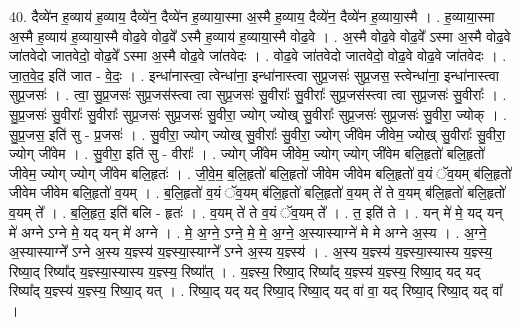 \documentclass[17pt]{extarticle}
\begin{document}
40. दैव्ये॑न ह॒व्याय॑ ह॒व्याय॒ दैव्ये॑न॒ दैव्ये॑न ह॒व्याया॒स्मा अ॒स्मै ह॒व्याय॒ दैव्ये॑न॒ दैव्ये॑न ह॒व्याया॒स्मै । . ह॒व्याया॒स्मा अ॒स्मै ह॒व्याय॑ ह॒व्याया॒स्मै वोढ॒वे वोढ॒वे᳚ ऽस्मै ह॒व्याय॑ ह॒व्याया॒स्मै वोढ॒वे । . अ॒स्मै वोढ॒वे वोढ॒वे᳚ ऽस्मा अ॒स्मै वोढ॒वे जा॑तवेदो जातवेदो॒ वोढ॒वे᳚ ऽस्मा अ॒स्मै वोढ॒वे जा॑तवेदः । . वोढ॒वे जा॑तवेदो जातवेदो॒ वोढ॒वे वोढ॒वे जा॑तवेदः । . जा॒त॒वे॒द॒ इति॑ जात - वे॒दः॒ । . इन्धा॑नास्त्वा॒ त्वेन्धा॑ना॒ इन्धा॑नास्त्वा सुप्र॒जसः॑ सुप्र॒जस॒ स्त्वेन्धा॑ना॒ इन्धा॑नास्त्वा सुप्र॒जसः॑ । . त्वा॒ सु॒प्र॒जसः॑ सुप्र॒जस॑स्त्वा त्वा सुप्र॒जसः॑ सु॒वीराः᳚ सु॒वीराः᳚ सुप्र॒जस॑स्त्वा त्वा सुप्र॒जसः॑ सु॒वीराः᳚ । . सु॒प्र॒जसः॑ सु॒वीराः᳚ सु॒वीराः᳚ सुप्र॒जसः॑ सुप्र॒जसः॑ सु॒वीरा॒ ज्योग् ज्योख् सु॒वीराः᳚ सुप्र॒जसः॑ सुप्र॒जसः॑ सु॒वीरा॒ ज्योक् । . सु॒प्र॒जस॒ इति॑ सु - प्र॒जसः॑ । . सु॒वीरा॒ ज्योग् ज्योख् सु॒वीराः᳚ सु॒वीरा॒ ज्योग् जी॑वेम जीवेम॒ ज्योख् सु॒वीराः᳚ सु॒वीरा॒ ज्योग् जी॑वेम । . सु॒वीरा॒ इति॑ सु - वीराः᳚ । . ज्योग् जी॑वेम जीवेम॒ ज्योग् ज्योग् जी॑वेम बलि॒हृतो॑ बलि॒हृतो॑ जीवेम॒ ज्योग् ज्योग् जी॑वेम बलि॒हृतः॑ । . जी॒वे॒म॒ ब॒लि॒हृतो॑ बलि॒हृतो॑ जीवेम जीवेम बलि॒हृतो॑ व॒यं ॅव॒यम् ब॑लि॒हृतो॑ जीवेम जीवेम बलि॒हृतो॑ व॒यम् । . ब॒लि॒हृतो॑ व॒यं ॅव॒यम् ब॑लि॒हृतो॑ बलि॒हृतो॑ व॒यम् ते॑ ते व॒यम् ब॑लि॒हृतो॑ बलि॒हृतो॑ व॒यम् ते᳚ । . ब॒लि॒हृत॒ इति॑ बलि - हृतः॑ । . व॒यम् ते॑ ते व॒यं ॅव॒यम् ते᳚ । . त॒ इति॑ ते । . यन् मे॑ मे॒ यद् यन् मे॑ अग्ने ऽग्ने मे॒ यद् यन् मे॑ अग्ने । . मे॒ अ॒ग्ने॒ ऽग्ने॒ मे॒ मे॒ अ॒ग्ने॒ अ॒स्यास्याग्ने॑ मे मे अग्ने अ॒स्य । . अ॒ग्ने॒ अ॒स्यास्याग्ने᳚ ऽग्ने अ॒स्य य॒ज्ञ्स्य॑ य॒ज्ञ्स्या॒स्याग्ने᳚ ऽग्ने अ॒स्य य॒ज्ञ्स्य॑ । . अ॒स्य य॒ज्ञ्स्य॑ य॒ज्ञ्स्या॒स्यास्य य॒ज्ञ्स्य॒ रिष्या॒द् रिष्या᳚द् य॒ज्ञ्स्या॒स्यास्य य॒ज्ञ्स्य॒ रिष्या᳚त् । . य॒ज्ञ्स्य॒ रिष्या॒द् रिष्या᳚द् य॒ज्ञ्स्य॑ य॒ज्ञ्स्य॒ रिष्या॒द् यद् यद् रिष्या᳚द् य॒ज्ञ्स्य॑ य॒ज्ञ्स्य॒ रिष्या॒द् यत् । . रिष्या॒द् यद् यद् रिष्या॒द् रिष्या॒द् यद् वा॑ वा॒ यद् रिष्या॒द् रिष्या॒द् यद् वा᳚ । \newline
\pagebreak
{}
\end{document}
